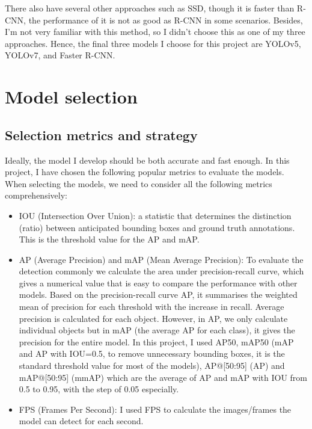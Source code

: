 \documentclass[runningheads]{llncs}
\begin{document}
There also have several other approaches such as SSD, though it is faster than R-CNN, the performance of it is not as good as R-CNN in some scenarios. Besides, I'm not very familiar with this method, so I didn't choose this as one of my three approaches. Hence, the final three models I choose for this project are YOLOv5, YOLOv7, and Faster R-CNN.

\section{Model selection}
\subsection{Selection metrics and strategy}
Ideally, the model I develop should be both accurate and fast enough. In this project, I have chosen the following popular metrics to evaluate the models. When selecting the models, we need to consider all the following metrics comprehensively:
\begin{itemize}
  \item IOU (Intersection Over Union): a statistic that determines the distinction (ratio) between anticipated bounding boxes and ground truth annotations. This is the threshold value for the AP and mAP.
  \item AP (Average Precision) and mAP (Mean Average Precision): To evaluate the detection commonly we calculate the area under precision-recall curve, which gives a numerical value that is easy to compare the performance with other models. Based on the precision-recall curve AP, it summarises the weighted mean of precision for each threshold with the increase in recall. Average precision is calculated for each object. However, in AP, we only calculate individual objects but in mAP (the average AP for each class), it gives the precision for the entire model. In this project, I used AP50, mAP50 (mAP and AP with IOU=0.5, to remove unnecessary bounding boxes, it is the standard threshold value for most of the models), AP@[50:95] (AP) and mAP@[50:95] (mmAP) which are the average of AP and mAP with IOU from 0.5 to 0.95, with the step of 0.05 especially.
  \item FPS (Frames Per Second): I used FPS to calculate the images/frames the model can detect for each second.
\end{itemize}
\end{document}
